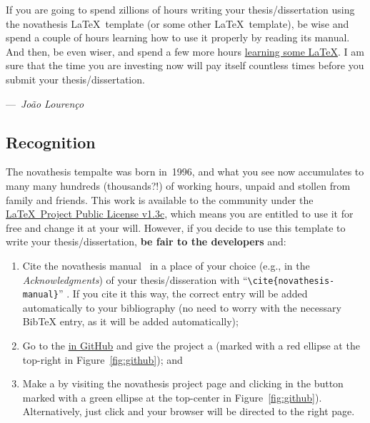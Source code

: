 \begin{tcolorbox}
  If you are going to spend zillions of hours writing your thesis/dissertation using the \gls{novathesis} \LaTeX\ template (or some other \LaTeX\ template), be wise and spend a couple of hours learning how to use it properly by reading its manual.  And then, be even wiser, and spend a few more hours \href{https://github.com/joaomlourenco/novathesis/wiki\#learning-latex}{learning some \LaTeX}.  I am sure that the time you are investing now will pay itself countless times before you submit your thesis/dissertation.\\\parbox{\linewidth}{\raggedleft---~\emph{João Lourenço}}
\end{tcolorbox}

\subsection{Recognition}
\label{sub:recognition}

\ntindex[Recognition]{}

The \gls{novathesis} tempalte was born in~1996, and what you see now accumulates to many many hundreds (thousands?!) of working hours, unpaid and stollen from family and friends.  This work is available to the community under the \href{LaTeX project public license}{\LaTeX\ Project Public License v1.3c}, which means you are entitled to use it for free and change it at your will.  However, if you decide to use this template to write your thesis/dissertation, \textbf{be fair to the developers} and:
\begin{enumerate}
  \item {} Cite the \gls{novathesis} manual~\cite{novathesis-manual} in a place of your choice (e.g., in the \emph{Acknowledgments}) of your thesis/disseration with “\verb!\cite{novathesis-manual}!” .  If you cite it this way, the correct entry will be added automatically to your bibliography (no need to worry with the necessary BibTeX entry, as it will be added automatically);
  \item Go to the
\href{https://github.com/joaomlourenco/novathesis}{ in GitHub} and give the project a  (marked with a red ellipse at the top-right in Figure~\ref{fig:github}); and
  \item Make a  by visiting the \gls{novathesis} project page and clicking in the button marked with a green ellipse at the top-center in Figure~\ref{fig:github}).  Alternatively, just click \href{https://www.paypal.com/donate/?hosted_button_id=8WA8FRVMB78W8}{} and your browser will be directed to the right page.
\end{enumerate}

